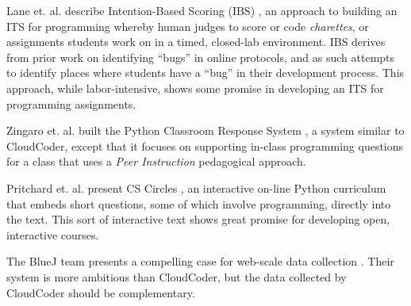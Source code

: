 \documentclass{sig-alternate}
\begin{document}
Lane et. al. describe Intention-Based Scoring (IBS) \cite{Lane:2005:ISA:1047344.1047471},
an approach to building an ITS for programming whereby human
judges to score or code {\em charettes}, or assignments students work on in a
timed, closed-lab environment.  IBS derives from prior work on
identifying ``bugs'' in online protocols, and as such attempts to
identify places where students have a ``bug'' in their development
process.  This approach, while labor-intensive, shows some promise in
developing an ITS for programming assignments.

Zingaro et. al. built the Python Classroom Response System
\cite{Zingaro:2013:FCP:2445196.2445369}, a system similar to
CloudCoder, except that it focuses on supporting in-class programming
questions for a class that uses a {\em Peer Instruction} pedagogical approach.

Pritchard et. al. present CS Circles
\cite{Pritchard:2013:CCI:2445196.2445370}, an interactive on-line
Python curriculum that embeds short questions, some of which involve
programming, directly into the text.  This sort of interactive text
shows great promise for developing open, interactive courses.

The BlueJ team presents a compelling case for web-scale data
collection \cite{Utting:2012:WDG:2361276.2361278}.  Their system is
more ambitious than CloudCoder, but the data collected by CloudCoder
should be complementary.
\end{document}
